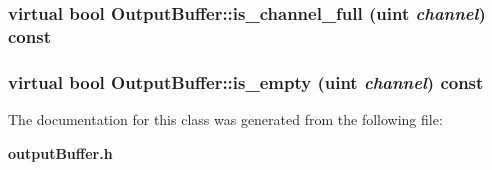 \subsubsection[{is\_\-channel\_\-full}]{\setlength{\rightskip}{0pt plus 5cm}virtual bool OutputBuffer::is\_\-channel\_\-full ({\bf uint} {\em channel}) const\hspace{0.3cm}{\tt  [pure virtual]}}\label{classOutputBuffer_23aaeb2aa62e944596d50a569ed5d859}


\subsubsection[{is\_\-empty}]{\setlength{\rightskip}{0pt plus 5cm}virtual bool OutputBuffer::is\_\-empty ({\bf uint} {\em channel}) const\hspace{0.3cm}{\tt  [pure virtual]}}\label{classOutputBuffer_7cba09e2dbb3794d873862b5066fd085}




The documentation for this class was generated from the following file:\begin{CompactItemize}
\item 
{\bf outputBuffer.h}\end{CompactItemize}
